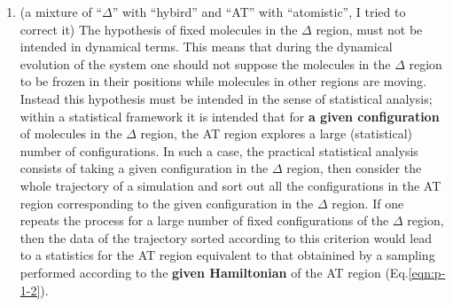 \documentclass[aip,jcp,a4paper,reprint,onecolumn]{revtex4-1}
\newcommand{\redc}[1]{{\color{red} #1}}
\newcommand{\bluec}[1]{{\color{blue} #1}}
\newcommand{\AT}{{\textrm{{AT}}}}
\newcommand{\HY}{{\Delta}}
\begin{document}
\begin{enumerate}
\item \redc{\bluec{(a mixture of ``$\HY$'' with ``hybird'' and ``\AT'' with ``atomistic'', I tried to correct it)} The hypothesis of fixed molecules in the $\HY$ region, must not be intended in dynamical terms. This means that during the dynamical evolution of the system one should not suppose the molecules in the $\HY$ region to be frozen in their positions while molecules in other regions are moving. Instead this hypothesis must be intended in the sense of statistical analysis; within a statistical framework it is intended that for {\bf a given configuration} of molecules \bluec{in the $\HY$ region, the AT region} explores a large (statistical) number of configurations. In such a case, the practical statistical analysis consists of taking a given configuration in the $\HY$ region, then consider the whole trajectory of a simulation and sort out all the configurations in the AT region corresponding to the given configuration in the $\HY$ region. If one repeats the process for a large number of fixed configurations of the $\HY$ region, then the data of the trajectory sorted according to this criterion would lead to a statistics for the AT region equivalent to that obtainined by a sampling performed according to the {\bf given Hamiltonian} of the AT region (Eq.\ref{eqn:p-1-2}).}

\end{enumerate}
\end{document}
